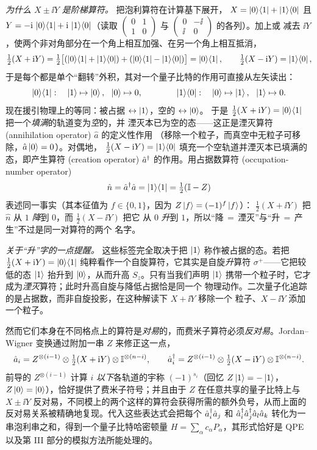 \begin{example}[二次量子化下的费米子哈密顿量]
\emph{为什么 $X\pm\ii Y$ 是阶梯算符。} 把泡利算符在计算基下展开，
$X=\ket0\!\bra1+\ket1\!\bra0$ 且 $Y=-\mathrm{i}\,\ket0\!\bra1+\mathrm{i}\,\ket1\!\bra0$（读取
$\left(\begin{smallmatrix}0&1\\1&0\end{smallmatrix}\right)$ 与
$\left(\begin{smallmatrix}0&-\ii\\\ii&0\end{smallmatrix}\right)$ 的各列）。加上或
减去 $\ii Y$，使两个非对角部分在一个角上相互加强、在另一个角上相互抵消，
\[
  \tfrac12(X+\mathrm{i} Y)=\tfrac12\bigl[(\ket0\!\bra1+\ket1\!\bra0)
      +(\ket0\!\bra1-\ket1\!\bra0)\bigr]=\ket0\!\bra1,
  \qquad
  \tfrac12(X-\mathrm{i} Y)=\ket1\!\bra0 ,
\]
于是每个都是单个“翻转”外积，其对一个量子比特的作用可直接从左矢读出：
\[
  \ket0\!\bra1:\quad \ket1\mapsto\ket0,\ \ \ket0\mapsto0 ,
  \qquad\qquad
  \ket1\!\bra0:\quad \ket0\mapsto\ket1,\ \ \ket1\mapsto0 .
\]
现在援引物理上的等同：被占据 $\leftrightarrow\ket1$，空的 $\leftrightarrow\ket0$。
于是 $\tfrac12(X+\mathrm{i} Y)=\ket0\!\bra1$ 把一个\emph{填满}的轨道变为\emph{空}的，并
湮灭本已为空的态——这正是湮灭算符 (annihilation operator) $\hat a$ 的定义性作用
（移除一个粒子，而真空中无粒子可移除，$\hat a\ket0=0$）。对偶地，
$\tfrac12(X-\mathrm{i} Y)=\ket1\!\bra0$ 填充一个空轨道并湮灭本已填满的态，即产生算符
(creation operator) $\hat a^{\dagger}$ 的作用。用占据数算符 (occupation-number operator)
\[
  \hat n=\hat a^{\dagger}\hat a=\ket1\!\bra1=\tfrac12(\mathbb{I}-Z)
\]
表述同一事实（其本征值为 $f\in\{0,1\}$，因为 $Z\ket f=(-1)^{f}\ket f$）：
$\tfrac12(X+\ii Y)$ 把 $\hat n$ 从 $1$ \emph{降}到 $0$，而 $\tfrac12(X-\ii Y)$ 把它
从 $0$ \emph{升}到 $1$，所以“降$\,=\,$湮灭”与“升$\,=\,$产生”不过是同一对算符的两个
名字。

\emph{关于“升”字的一点提醒。} 这些标签完全取决于把 $\ket1$ 称作被占据的态。若把
$\tfrac12(X+\mathrm{i} Y)=\ket0\!\bra1$ 纯粹看作一个自旋算符，它其实是自旋\emph{升}算符
$\sigma^{+}$——它把较低的态 $\ket1$ 抬升到 $\ket0$，从而升高 $S_z$。只有当我们声明
$\ket1$ 携带一个粒子时，它才成为\emph{湮灭}算符；此时升高自旋与降低占据恰是同一个
物理动作。二次量子化追踪的是占据数，而非自旋投影，在这种解读下 $X+\ii Y$ 移除一个
粒子、$X-\ii Y$ 添加一个粒子。

然而它们本身在不同格点上的算符是\emph{对易}的，而费米子算符必须\emph{反对易}。Jordan--Wigner 变换通过附加一串 $Z$ 来修正这一点，
\[
  \hat a_i= Z^{\otimes(i-1)}\otimes\tfrac12(X+\mathrm{i} Y)\otimes\mathbb{I}^{\otimes(n-i)},
  \qquad
  \hat a_i^{\dagger}= Z^{\otimes(i-1)}\otimes\tfrac12(X-\mathrm{i} Y)\otimes\mathbb{I}^{\otimes(n-i)}.
\]
前导的 $Z^{\otimes(i-1)}$ 计算 $i$ \emph{以下}各轨道的宇称 $(-1)^{s_i}$（回忆 $Z\ket1=-\ket1$，$Z\ket0=\ket0$），恰好提供了费米子符号；并且由于 $Z$ 在任意共享的量子比特上与 $X\pm\ii Y$ 反对易，不同模上的两个这样的算符会获得所需的额外负号，从而上面的反对易关系被精确地复现。代入这些表达式会把每个 $\hat a_i^{\dagger}\hat a_j$ 和 $\hat a_i^{\dagger}\hat a_j^{\dagger}\hat a_l\hat a_k$ 转化为一串泡利串之和，得到一个量子比特哈密顿量
$H=\sum_\alpha c_\alpha P_\alpha$，其形式恰好是 QPE 以及第 III 部分的模拟方法所能处理的。


\end{example}
